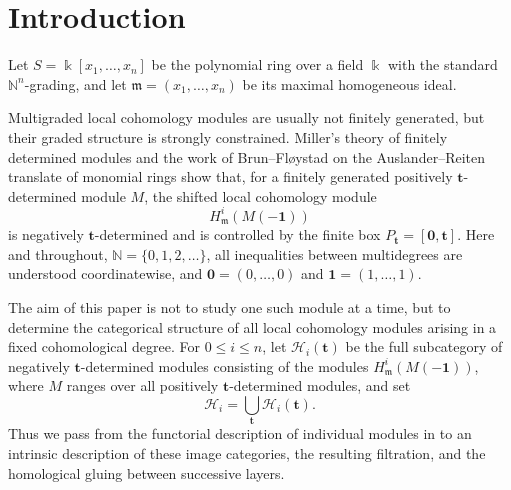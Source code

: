 \documentclass[12pt,reqno]{amsart}
\theoremstyle{definition}
\theoremstyle{remark}
\begin{document}
\begingroup
\setcounter{tocdepth}{1}
\tableofcontents
\endgroup

\section{Introduction}
Let $S=\Bbbk[x_1,\ldots,x_n]$ be the polynomial ring over a field $\Bbbk$ with the standard $\mathbb N^n$-grading, and let $\mathfrak m=(x_1,\ldots,x_n)$ be its maximal homogeneous ideal.

Multigraded local cohomology modules are usually not finitely generated, but their graded structure is strongly constrained.  Miller's theory of finitely determined modules \cite{Miller} and the work of Brun--Fl\o ystad on the Auslander--Reiten translate of monomial rings \cite{BF} show that, for a finitely generated positively $\mathbf t$-determined module $M$, the shifted local cohomology module
\[
H^i_{\mathfrak m}(M(-\mathbf1))
\]
is negatively $\mathbf t$-determined and is controlled by the finite box
$P_{\mathbf t}=[\mathbf0,\mathbf t]$.  Here and throughout,
$\mathbb N=\{0,1,2,\ldots\}$, all inequalities between multidegrees are
understood coordinatewise, and
$\mathbf0=(0,\ldots,0)$ and $\mathbf1=(1,\ldots,1)$.

The aim of this paper is not to study one such module at a time, but to determine the categorical structure of all local cohomology modules arising in a fixed cohomological degree.  For $0\le i\le n$, let $\mathcal H_i(\mathbf t)$ be the full subcategory of negatively $\mathbf t$-determined modules consisting of the modules $H^i_{\mathfrak m}(M(-\mathbf1))$, where $M$ ranges over all positively $\mathbf t$-determined modules, and set
\[
\mathcal H_i=\bigcup_{\mathbf t}\mathcal H_i(\mathbf t).
\]
Thus we pass from the functorial description of individual modules in \cite{BF} to an intrinsic description of these image categories, the resulting filtration, and the homological gluing between successive layers.
\end{document}
